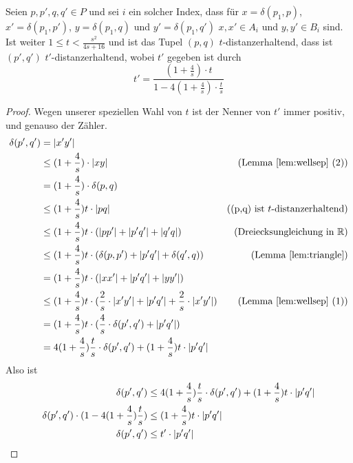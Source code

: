     \begin{lemma}
    	\label{lem:stranget}
    	Seien $p, p', q, q' \in P$ und sei $i$ ein solcher Index, dass für $x = \delta(p_1, p)$, $x' = \delta(p_1, p')$, $y = \delta(p_1, q)$ und $y' = \delta(p_1, q')$ $x, x' \in A_i$ und $y, y' \in B_i$ sind. Ist weiter $1 \leq t < \frac{s^2}{4s + 16}$ und ist das Tupel $(p, q)$ $t$-distanzerhaltend, dass ist $(p', q')$ $t'$-distanzerhaltend, wobei $t'$ gegeben ist durch 
    	\[t' = \frac{(1+\frac{4}{s})\cdot t}{1 - 4(1 + \frac{4}{s})\cdot\frac{t}{s}}\]
    \end{lemma}
    \begin{proof}
    	Wegen unserer speziellen Wahl von $t$ ist der Nenner von $t'$ immer positiv, und genauso der Zähler.
    	\begin{align*}
	    	\delta(p', q') &= |x'y'| 
	    	\\ &\leq (1 + \frac{4}{s})\cdot|xy| & \text{(Lemma \ref{lem:wellsep} (2))}
	    	\\ &= (1 + \frac{4}{s})\cdot\delta(p, q)
	    	\\ &\leq (1 + \frac{4}{s})t\cdot |pq| & \text{((p,q) ist $t$-distanzerhaltend)}
	    	\\ &\leq (1 + \frac{4}{s})t\cdot (|pp'| + |p'q'| + |q'q|) & \text{(Dreiecksungleichung in $\mathbb{R}$)}
	    	\\ &\leq (1 + \frac{4}{s})t\cdot (\delta(p,p') + |p'q'| + \delta(q', q)) & \text{(Lemma \ref{lem:triangle})}
	    	\\ &= (1 + \frac{4}{s})t\cdot (|xx'| + |p'q'| + |yy'|)
	    	\\ &\leq (1 + \frac{4}{s})t\cdot (\frac{2}{s}\cdot|x'y'| + |p'q'| + \frac{2}{s}\cdot|x'y'|) & \text{(Lemma \ref{lem:wellsep} (1))}
	    	\\ &= (1 + \frac{4}{s})t\cdot (\frac{4}{s}\cdot\delta(p',q') + |p'q'|)
	    	\\ &= 4(1 + \frac{4}{s})\frac{t}{s}\cdot \delta(p',q') + (1 + \frac{4}{s})t\cdot|p'q'|
    	\end{align*}
    	Also ist
    	\begin{align*}
	    	\delta(p', q') &\leq 4(1 + \frac{4}{s})\frac{t}{s}\cdot \delta(p',q') + (1 + \frac{4}{s})t\cdot|p'q'|
	    	\\ \delta(p', q') \cdot (1 - 4(1 + \frac{4}{s})\frac{t}{s}) &\leq (1 + \frac{4}{s})t\cdot|p'q'| \tag*{\llap{\makebox[\linewidth][l]{$\Leftrightarrow$}}}
	    	\\ \delta(p',q') &\leq t' \cdot |p'q'| \tag*{\llap{\makebox[\linewidth][l]{$\Leftrightarrow$}}}
    	\end{align*}
    \end{proof}
    
